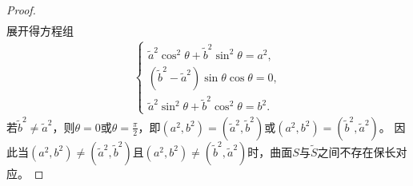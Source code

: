 \documentclass[../../main.tex]{subfiles}%
\begin{document}
\begin{proof}
\begin{align*}
\end{align*}
展开得方程组
\begin{align*}
\begin{cases}
\tilde{a}^2\cos^2\theta+\tilde{b}^2\sin^2\theta=a^2,\\
(\tilde{b}^2-\tilde{a}^2)\sin\theta\cos\theta=0,\\
\tilde{a}^2\sin^2\theta+\tilde{b}^2\cos^2\theta=b^2.
\end{cases}
\end{align*}
若$\tilde{b}^2\neq\tilde{a}^2$，则$\theta=0$或$\theta=\frac{\pi}{2}$，即$(a^2,b^2)=(\tilde{a}^2,\tilde{b}^2)$或$(a^2,b^2)=(\tilde{b}^2,\tilde{a}^2)$。
因此当$(a^2,b^2)\neq(\tilde{a}^2,\tilde{b}^2)$且$(a^2,b^2)\neq(\tilde{b}^2,\tilde{a}^2)$时，曲面$S$与$\tilde{S}$之间不存在保长对应。

\end{proof}
\end{document}
